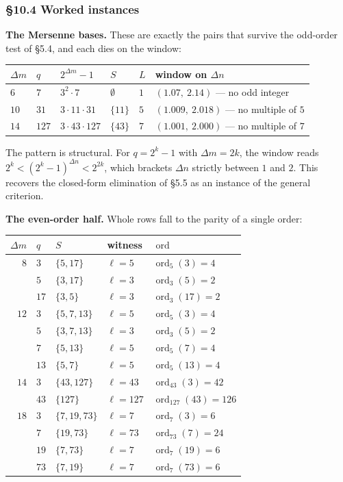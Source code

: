 \documentclass[11pt]{article}
\begin{document}
\subsubsection*{\S10.4 Worked instances}

\noindent\textbf{The Mersenne bases.} These are exactly the pairs that survive the odd-order test of \S5.4, and each dies on the window:
\begin{center}
\begin{tabular}{llllll}
\hline
$\Delta m$ & $q$ & $2^{\Delta m}-1$ & $S$ & $L$ & window on $\Delta n$ \\
\hline
$6$ & $7$ & $3^2\cdot 7$ & $\emptyset$ & $1$ & $(1.07,\ 2.14)$ --- no odd integer \\
$10$ & $31$ & $3\cdot 11\cdot 31$ & $\{11\}$ & $5$ & $(1.009,\ 2.018)$ --- no multiple of $5$ \\
$14$ & $127$ & $3\cdot 43\cdot 127$ & $\{43\}$ & $7$ & $(1.001,\ 2.000)$ --- no multiple of $7$ \\
\hline
\end{tabular}
\end{center}
The pattern is structural. For $q = 2^{k}-1$ with $\Delta m = 2k$, the window reads $2^{k} < \left(2^{k}-1\right)^{\Delta n} < 2^{2k}$, which brackets $\Delta n$ strictly between $1$ and $2$. This recovers the closed-form elimination of \S5.5 as an instance of the general criterion.

\medskip
\noindent\textbf{The even-order half.} Whole rows fall to the parity of a single order:
\begin{center}
\begin{tabular}{rllll}
\hline
$\Delta m$ & $q$ & $S$ & witness & $\operatorname{ord}$ \\
\hline
$8$ & $3$ & $\{5,17\}$ & $\ell = 5$ & $\operatorname{ord}_5(3) = 4$ \\
& $5$ & $\{3,17\}$ & $\ell = 3$ & $\operatorname{ord}_3(5) = 2$ \\
& $17$ & $\{3,5\}$ & $\ell = 3$ & $\operatorname{ord}_3(17) = 2$ \\
$12$ & $3$ & $\{5,7,13\}$ & $\ell = 5$ & $\operatorname{ord}_5(3) = 4$ \\
& $5$ & $\{3,7,13\}$ & $\ell = 3$ & $\operatorname{ord}_3(5) = 2$ \\
& $7$ & $\{5,13\}$ & $\ell = 5$ & $\operatorname{ord}_5(7) = 4$ \\
& $13$ & $\{5,7\}$ & $\ell = 5$ & $\operatorname{ord}_5(13) = 4$ \\
$14$ & $3$ & $\{43,127\}$ & $\ell = 43$ & $\operatorname{ord}_{43}(3) = 42$ \\
& $43$ & $\{127\}$ & $\ell = 127$ & $\operatorname{ord}_{127}(43) = 126$ \\
$18$ & $3$ & $\{7,19,73\}$ & $\ell = 7$ & $\operatorname{ord}_7(3) = 6$ \\
& $7$ & $\{19,73\}$ & $\ell = 73$ & $\operatorname{ord}_{73}(7) = 24$ \\
& $19$ & $\{7,73\}$ & $\ell = 7$ & $\operatorname{ord}_7(19) = 6$ \\
& $73$ & $\{7,19\}$ & $\ell = 7$ & $\operatorname{ord}_7(73) = 6$ \\
\hline
\end{tabular}
\end{center}
\end{document}
